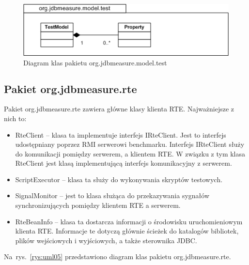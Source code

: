 \begin{itemize}
\begin{figure}[h]
\begin{center}
\includegraphics[width=0.8\linewidth]{figures/uml04.png}
\end{center}
\caption{Diagram klas pakietu org.jdbmeasure.model.test}\label{rys:uml04}
\end{figure}

\end{itemize} 

\subsection{Pakiet org.jdbmeasure.rte}
Pakiet org.jdbmeasure.rte zawiera główne klasy klienta RTE. Najważniejsze z nich to:
\begin{itemize}
\item RteClient -- klasa ta implementuje interfejs IRteClient. Jest to interfejs udostępniany poprzez RMI serwerowi benchmarku.
Interfejs IRteClient służy do komunikacji pomiędzy serwerem, a klientem RTE. W związku z tym klasa RteClient jest klasą implementującą
interfejs komunikacyjny z serwerem.
\item ScriptExecutor -- klasa ta służy do wykonywania skryptów testowych.
\item SignalMonitor -- jest to klasa służąca do przekazywania sygnałów synchronizujących pomiędzy klientem RTE a serwerem.
\item RteBeanInfo -- klasa ta dostarcza informacji o środowisku uruchomieniowym klienta RTE. Informacje te dotyczą głównie
ścieżek do katalogów bibliotek, plików wejściowych i wyjściowych, a także sterownika JDBC.
\end{itemize}
Na~rys.~\ref{rys:uml05} przedstawiono diagram klas pakietu org.jdbmeasure.rte.
